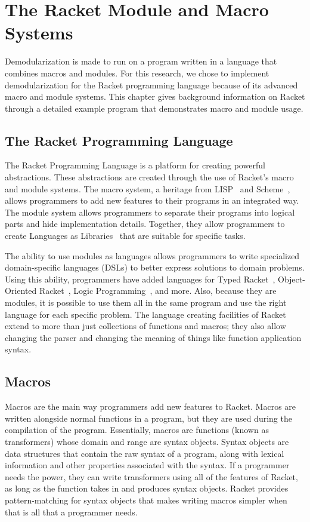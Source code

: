\chapter{The Racket Module and Macro Systems}
\label{chap:module-system}

Demodularization is made to run on a program written in a language that combines macros and modules.
For this research, we chose to implement demodularization for the Racket programming language because of its advanced macro and module systems.
This chapter gives background information on Racket through a detailed example program that demonstrates macro and module usage.

\section{The Racket Programming Language}
The Racket Programming Language is a platform for creating powerful abstractions.
These abstractions are created through the use of Racket's macro and module systems. 
The macro system, a heritage from LISP~\cite{LISP} and Scheme~\cite{scheme}, allows programmers to add new features to their programs in an integrated way.
The module system allows programmers to separate their programs into logical parts and hide implementation details. 
Together, they allow programmers to create Languages as Libraries~\cite{lal} that are suitable for specific tasks.

The ability to use modules as languages allows programmers to write specialized domain-specific languages (DSLs) to better express solutions to domain problems. 
Using this ability, programmers have added languages for Typed Racket~\cite{typed}, Object-Oriented Racket~\cite{oo}, Logic Programming~\cite{logic}, and more.
Also, because they are modules, it is possible to use them all in the same program and use the right language for each specific problem.
The language creating facilities of Racket extend to more than just collections of functions and macros; they also allow changing the parser and changing the meaning of things like function application syntax. 

\section{Macros}
Macros are the main way programmers add new features to Racket. 
Macros are written alongside normal functions in a program, but they are used during the compilation of the program. 
Essentially, macros are functions (known as transformers) whose domain and range are syntax objects.
Syntax objects are data structures that contain the raw syntax of a program, along with lexical information and other properties associated with the syntax.
If a programmer needs the power, they can write transformers using all of the features of Racket, as long as the function takes in and produces syntax objects.
Racket provides pattern-matching for syntax objects that makes writing macros simpler when that is all that a programmer needs.

